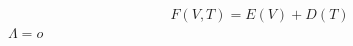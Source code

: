\documentclass[preview]{standalone}
\begin{document}
\begin{equation} %
F(V, T) = E(V) + D(T)
\end{equation}
$\Lambda = o $
\end{document}
